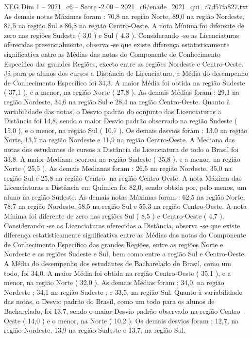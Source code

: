 \begin{textsample}{NEG Dim 1 – 2021\_c6 – Score -2.00 – 2021\_c6/enade\_2021\_qui\_a7d57fa827.txt}
As demais notas Máximas foram : 70,8 na região Norte, 89,0 na região Nordeste, 87,5 na região Sul e 86,8 na região Centro-Oeste.
A nota Mínima foi diferente de zero nas regiões Sudeste ( 3,0 ) e Sul ( 4,3 ).
Considerando -se as Licenciaturas oferecidas presencialmente, observa -se que existe diferença estatisticamente significativa entre as Médias das notas do Componente de Conhecimento Específico das grandes Regiões, exceto entre as regiões Nordeste e Centro-Oeste.
Já para os alunos dos cursos a Distância de Licenciatura, a Média do desempenho de Conhecimento Específico foi 34,3.
A maior Média foi obtida na região Sudeste ( 37,1 ), e a menor, na região Norte ( 27,8 ).
As demais Médias foram : 29,1 na região Nordeste, 34,6 na região Sul e 28,4 na região Centro-Oeste.
Quanto à variabilidade das notas, o Desvio padrão do conjunto das Licenciaturas a Distância foi 14,8, sendo o maior Desvio padrão observado na região Sudeste ( 15,0 ), e o menor, na região Sul ( 10,7 ).
Os demais desvios foram : 13,0 na região Norte, 13,7 na região Nordeste e 11,9 na região Centro-Oeste.
A Mediana das notas dos estudantes de cursos a Distância de Licenciatura de todo o Brasil foi 33,8.
A maior Mediana ocorreu na região Sudeste ( 35,8 ), e a menor, na região Norte ( 25,5 ).
As demais Medianas foram : 26,5 na região Nordeste, 35,0 na região Sul e 25,8 na região Centro- na região Centro-Oeste.
A nota Máxima das Licenciaturas a Distância em Química foi 82,0, sendo obtida por, pelo menos, um aluno na região Sudeste.
As demais notas Máximas foram : 62,5 na região Norte, 78,7 na região Nordeste, 58,5 na região Sul e 55,3 na região Centro-Oeste.
A nota Mínima foi diferente de zero nas regiões Sul ( 8,5 ) e Centro-Oeste ( 4,7 ).
Considerando -se as Licenciaturas oferecidas a Distância, observa -se que existe diferença estatisticamente significativa entre as Médias das notas do Componente de Conhecimento Específico das grandes Regiões, entre as regiões Norte e Nordeste e as regiões Sudeste e Sul, bem como entre a região Sul e Centro-Oeste.
A Média do desempenho dos estudantes de Bacharelado do Brasil, como um todo, foi 34,0.
A maior Média foi obtida na região Centro-Oeste ( 35,1 ), e a menor, na região Norte ( 32,0 ).
As demais Médias foram : 34,0, na região Nordeste ; 34,1 na região Sudeste ; e 33,5, na região Sul.
Quanto à variabilidade das notas, o Desvio padrão do Brasil, como um todo para os alunos de Bacharelado, foi 13,7, sendo o maior Desvio padrão observado na região Centro-Oeste ( 14,0 ) e o menor, na Norte ( 10,2 ).
Os demais desvios foram : 12,7, na região Nordeste, 13,9 na região Sudeste e 13,7, na região Sul.

\end{textsample}
